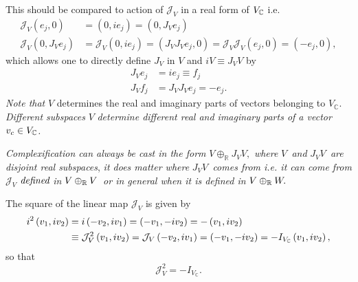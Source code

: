 \documentclass[aps,preprint]{revtex4}
\begin{document}
This should be compared to action of $\mathcal{J}_{V}$ in a real form of $V_{%
\mathbb{C}}$ i.e.%
\begin{align}
\mathcal{J}_{V}\left( e_{j},0\right) & =\left( 0,ie_{j}\right) =\left(
0,J_{V}e_{j}\right) \\
\mathcal{J}_{V}\left( 0,J_{V}e_{j}\right) & =\mathcal{J}_{V}\left(
0,ie_{j}\right) =\left( J_{V}J_{V}e_{j},0\right) =\mathcal{J}_{V}\mathcal{J}%
_{V}\left( e_{j},0\right) =\left( -e_{j},0\right) ,
\end{align}%
which allows one to directly define $J_{V}$ in $V$ and $iV\equiv J_{V}V$ by 
\begin{align}
J_{V}e_{j}& =ie_{j}\equiv f_{j} \\
J_{V}f_{j}& =J_{V}J_{V}e_{j}=-e_{j}.
\end{align}%
\emph{Note that }$V$ determines the real and imaginary parts of vectors
belonging to $V_{\mathbb{C}}.$ \emph{Different subspaces }$V$ \emph{%
determine different real and imaginary parts of a vector }$v_{c}\in V_{%
\mathbb{C}}$\emph{.}

\emph{Complexification can always be cast in the form }$V\oplus _{\mathbb{R}%
}J_{V}V,$ \emph{where }$V$\emph{\ and }$J_{V}V$\emph{\ are disjoint real
subspaces}, \emph{it does matter where }$J_{V}V$\emph{\ comes from i.e. it
can come from }$\mathcal{J}_{V}$ $\emph{defined}$ \emph{in} $V\oplus _{%
\mathbb{R}}V$\emph{\ or in general when it is defined in }$V\oplus _{\mathbb{%
R}}W.$ \qquad

The square of the linear map $\mathcal{J}_{V}$ is given by 
\begin{align}
i^{2}\left( v_{1},iv_{2}\right) & =i\left( -v_{2},iv_{1}\right) =\left(
-v_{1},-iv_{2}\right) =-\left( v_{1},iv_{2}\right) \\
& \equiv \mathcal{J}_{V}^{2}\left( v_{1},iv_{2}\right) =\mathcal{J}%
_{V}\left( -v_{2},iv_{1}\right) =\left( -v_{1},-iv_{2}\right) =-I_{V_{%
\mathbb{C}}}\left( v_{1},iv_{2}\right) ,
\end{align}%
so that 
\begin{equation}
\mathcal{J}_{V}^{2}=-I_{V_{\mathbb{C}}}.
\end{equation}
\end{document}
